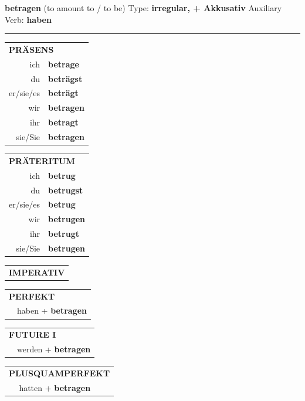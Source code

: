 \documentclass[10pt,a4paper]{revtex4-2}
\begin{document}
\begin{verbbox-acc}
{\Large \bf betragen} (to amount to / to be) \hfill Type: \textbf{irregular, + Akkusativ} \hfill Auxiliary Verb: \textbf{haben}

\vspace{5pt}
\hrule
\vspace{5pt}

\begin{tabular}{rl}
\multicolumn{2}{l}{\textbf{PRÄSENS}}\\
ich & \textbf{betrage}\\
du & \textbf{beträgst}\\
er/sie/es & \textbf{beträgt}\\
wir & \textbf{betragen}\\
ihr & \textbf{betragt}\\
sie/Sie & \textbf{betragen}\\
\end{tabular}
\hfill
\begin{tabular}{rl}
\multicolumn{2}{l}{\textbf{PRÄTERITUM}}\\
ich & \textbf{betrug}\\
du & \textbf{betrugst}\\
er/sie/es & \textbf{betrug}\\
wir & \textbf{betrugen}\\
ihr & \textbf{betrugt}\\
sie/Sie & \textbf{betrugen}\\
\end{tabular}
\hfill
\begin{tabular}{rl}
\multicolumn{2}{l}{\textbf{IMPERATIV}}\\
\end{tabular}

\vspace{10pt}

\begin{tabular}{rl}
\multicolumn{2}{l}{\textbf{PERFEKT}}\\
& haben + \textbf{betragen}\\
\end{tabular}
\hfill
\begin{tabular}{rl}
\multicolumn{2}{l}{\textbf{FUTURE I}}\\
& werden + \textbf{betragen}\\
\end{tabular}
\hfill
\begin{tabular}{rl}
\multicolumn{2}{l}{\textbf{PLUSQUAMPERFEKT}}\\
& hatten + \textbf{betragen}\\
\end{tabular}


\end{verbbox-acc}
\end{document}
